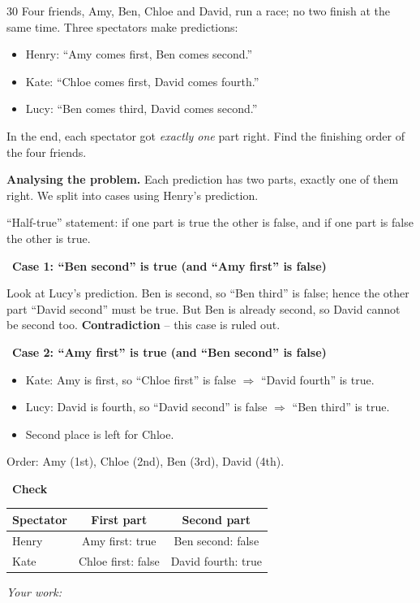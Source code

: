 \documentclass[11pt]{article}
\newif\ifsol \solfalse
\newenvironment{probbox}[2]{\begin{probboxT}{#1}{#2}}{\end{probboxT}}
\newcommand{\StuProb}[2]{\begin{probboxS}{#1}{#2}\StuProbBody\end{probboxS}}
\newcommand{\probsol}[1]{%
  \begin{lrbox}{\solmeasure}\begin{minipage}{\dimexpr\linewidth-24pt\relax}#1\end{minipage}\end{lrbox}%
  \ifsol
    \begin{solbox}#1\end{solbox}%
  \else
    \setlength{\solht}{\dimexpr\ht\solmeasure+\dp\solmeasure+0.85cm\relax}%
    \ifdim\solht<1.35cm\setlength{\solht}{1.35cm}\fi
    \ifdim\solht>\StudentMaxWork\setlength{\solht}{\StudentMaxWork}\fi
    \par\noindent\begin{minipage}{\linewidth}%
    \expandafter\StuProb\StuProbArgs
    \begin{tcolorbox}[colback=white,colframe=Line,boxrule=0.8pt,arc=5pt,
      left=8pt,right=8pt,top=4pt,bottom=4pt,height=\solht]{\footnotesize\color{Slate}\itshape\WorkWord}\end{tcolorbox}%
    \end{minipage}\par\medskip
  \fi}
\newlength{\StudentMaxWork}\setlength{\StudentMaxWork}{4.5cm}
\newcommand{\step}[2]{\par\smallskip\noindent{\bfseries\color{tmBlue!85!black}\StepWord~#1.}\ {\bfseries #2}\par\nopagebreak}
\def\WorkWord{Your work:}
\def\StepWord{Step}
\begin{document}
\begin{probbox}{30}{\relax}
Four friends, Amy, Ben, Chloe and David, run a race; no two finish at the same time. Three spectators make predictions:
\begin{itemize}[leftmargin=1.6em,itemsep=0pt,topsep=2pt]
\item Henry: ``Amy comes first, Ben comes second.''
\item Kate: ``Chloe comes first, David comes fourth.''
\item Lucy: ``Ben comes third, David comes second.''
\end{itemize}
In the end, each spectator got \emph{exactly one} part right. Find the finishing order of the four friends.
\end{probbox}
\probsol{
\textbf{Analysing the problem.} Each prediction has two parts, exactly one of them right. We split into cases using Henry's prediction.
\begin{recallbox}``Half-true'' statement: if one part is true the other is false, and if one part is false the other is true.\end{recallbox}
\step{1}{Case 1: ``Ben second'' is true (and ``Amy first'' is false)}
Look at Lucy's prediction. Ben is second, so ``Ben third'' is false; hence the other part ``David second'' must be true. But Ben is already
second, so David cannot be second too. \textbf{Contradiction} -- this case is ruled out.
\step{2}{Case 2: ``Amy first'' is true (and ``Ben second'' is false)}
\begin{itemize}[leftmargin=1.4em,itemsep=1pt,topsep=1pt]
\item Kate: Amy is first, so ``Chloe first'' is false $\Rightarrow$ ``David fourth'' is true.
\item Lucy: David is fourth, so ``David second'' is false $\Rightarrow$ ``Ben third'' is true.
\item Second place is left for Chloe.
\end{itemize}
Order: Amy (1st), Chloe (2nd), Ben (3rd), David (4th).
\step{3}{Check}
\begin{center}
\begin{tabular}{|l|c|c|}
\hline
\rowcolor{tmBlue!10} Spectator & First part & Second part \\ \hline
Henry & Amy first: \textcolor{tmGreen!70!black}{true} & Ben second: \textcolor{AnsRed}{false} \\ \hline
Kate & Chloe first: \textcolor{AnsRed}{false} & David fourth: \textcolor{tmGreen!70!black}{true} \\ \hline

\end{tabular}
\end{center}}
\end{document}

